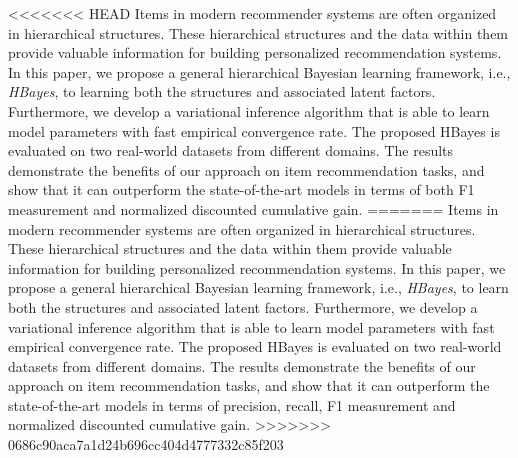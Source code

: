 <<<<<<< HEAD
Items in modern recommender systems are often organized in hierarchical structures. These hierarchical structures and the data within them provide valuable information for building personalized recommendation systems. In this paper, we propose a general hierarchical Bayesian learning framework, i.e., \emph{HBayes}, to learning both the structures and associated latent factors. Furthermore, we develop a variational inference algorithm that is able to learn model parameters with fast empirical convergence rate. The proposed HBayes is evaluated on two real-world datasets from different domains. The results demonstrate the benefits of our approach on item recommendation tasks, and show that it can outperform the state-of-the-art models in terms of both F1 measurement and normalized discounted cumulative gain.
=======
Items in modern recommender systems are often organized in hierarchical structures. These hierarchical structures and the data within them provide valuable information for building personalized recommendation systems. In this paper, we propose a general hierarchical Bayesian learning framework, i.e., \emph{HBayes}, to learn both the structures and associated latent factors. Furthermore, we develop a variational inference algorithm that is able to learn model parameters with fast empirical convergence rate. The proposed HBayes is evaluated on two real-world datasets from different domains. The results demonstrate the benefits of our approach on  item recommendation tasks, and show that it can outperform the state-of-the-art models in terms of precision, recall, F1 measurement and normalized discounted cumulative gain.
>>>>>>> 0686c90aca7a1d24b696cc404d4777332c85f203
